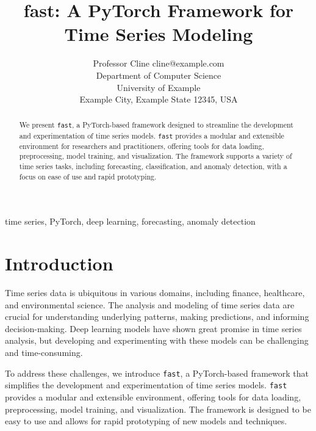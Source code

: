 \documentclass[twoside,11pt]{article}
\begin{document}
\title{fast: A PyTorch Framework for Time Series Modeling}

\author{\name Professor Cline \email cline@example.com \\
       \addr Department of Computer Science\\
       University of Example\\
       Example City, Example State 12345, USA
       }


\maketitle

\begin{abstract}%
We present \texttt{fast}, a PyTorch-based framework designed to streamline the development and experimentation of time series models. \texttt{fast} provides a modular and extensible environment for researchers and practitioners, offering tools for data loading, preprocessing, model training, and visualization. The framework supports a variety of time series tasks, including forecasting, classification, and anomaly detection, with a focus on ease of use and rapid prototyping.
\end{abstract}

\begin{keywords}
  time series, PyTorch, deep learning, forecasting, anomaly detection
\end{keywords}

\section{Introduction}

Time series data is ubiquitous in various domains, including finance, healthcare, and environmental science. The analysis and modeling of time series data are crucial for understanding underlying patterns, making predictions, and informing decision-making. Deep learning models have shown great promise in time series analysis, but developing and experimenting with these models can be challenging and time-consuming.

To address these challenges, we introduce \texttt{fast}, a PyTorch-based framework that simplifies the development and experimentation of time series models. \texttt{fast} provides a modular and extensible environment, offering tools for data loading, preprocessing, model training, and visualization. The framework is designed to be easy to use and allows for rapid prototyping of new models and techniques.
\end{document}
